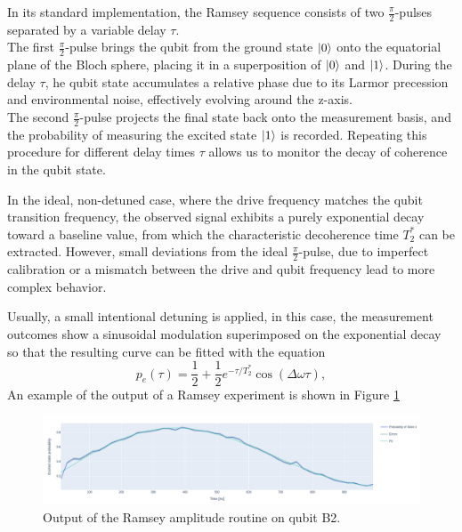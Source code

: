In its standard implementation, the Ramsey sequence consists of two $\frac{\pi}{2}$-pulses separated by a variable delay $\tau$.\\
The first $\frac{\pi}{2}$-pulse brings the qubit from the ground state $\ket{0}$ onto the equatorial plane of the Bloch sphere, placing it in a superposition of $\ket{0}$ and $\ket{1}$.
During the delay $\tau$, he qubit state accumulates a relative phase due to its Larmor precession and environmental noise, effectively evolving around the z-axis.\\
The second $\frac{\pi}{2}$-pulse projects the final state back onto the measurement basis, and the probability of measuring the excited state $\ket{1}$ is recorded.
Repeating this procedure for different delay times $\tau$ allows us to monitor the decay of coherence in the qubit state.

In the ideal, non-detuned case, where the drive frequency matches the qubit transition frequency, the observed signal exhibits a purely exponential decay toward a baseline value, from which the characteristic decoherence time $T_2^*$ can be extracted.
However, small deviations from the ideal $\frac{\pi}{2}$-pulse, due to imperfect calibration or a mismatch between the drive and qubit frequency lead to more complex behavior.

Usually, a small intentional detuning is applied, in this case, the measurement outcomes show a sinusoidal modulation superimposed on the exponential decay so that the resulting curve can be fitted with the equation \cite{Baur2012RealizingQG}
\begin{equation}\label{eq:Ramsey}
    p_e(\tau) = \frac{1}{2} + \frac{1}{2}e^{-\tau/T_2^*}\cos{(\Delta\omega \tau)},
\end{equation}
An example of the output of a Ramsey experiment is shown in Figure \ref{fig:ramsey}

\begin{figure}[h!]
    \centering
    \includegraphics[width=\textwidth]{figures/png/ramsey.png}
    \caption{Output of the Ramsey amplitude routine on qubit B2.}
    \label{fig:ramsey}
\end{figure}

